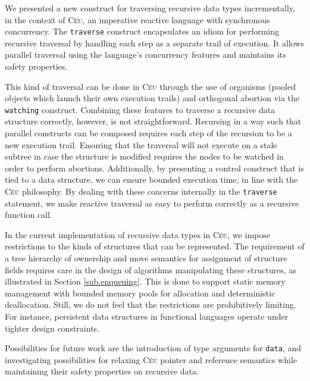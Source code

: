 \documentclass{sig-alternate}
\newcommand{\CEU}{\textsc{C\'{e}u}\xspace}
\newcommand{\code}[1] {{\small{\texttt{#1}}}}
\begin{document}
We presented a new construct for traversing recursive data types
incrementally, in the context of \CEU, an imperative reactive language with
synchronous concurrency. The \code{traverse} construct encapsulates an idiom
for performing recursive traversal by handling each step as a separate trail
of execution. It allows parallel traversal using the language's concurrency
features and maintains its safety properties.

This kind of traversal can be done in \CEU through the use of organisms
(pooled objects which launch their own execution trails) and orthogonal
abortion via the \code{watching} construct. Combining these features to
traverse a recursive data structure correctly, however, is not straightforward.
Recursing in a way such that parallel constructs can be composed requires each
step of the recursion to be a new execution trail. Ensuring that the traversal
will not execute on a stale subtree in case the structure is modified requires
the nodes to be watched in order to perform abortions. Additionally, by
presenting a control construct that is tied to a data structure, we can ensure
bounded execution time, in line with the \CEU philosophy. By dealing with these
concerns internally in the \code{traverse} statement, we make reactive
traversal as easy to perform correctly as a recursive function call.

In the current implementation of recursive data types in \CEU, we impose
restrictions to the kinds of structures that can be represented. The
requirement of a tree hierarchy of ownership and move semantics for assignment
of structure fields requires care in the design of algorithms
manipulating these structures, as illustrated in Section \ref{sub.enqueuing}.
This is done to support static memory management with bounded memory pools for
allocation and deterministic deallocation. Still, we do not feel that the
restrictions are prohibitively limiting. For instance, persistent data
structures in functional languages \cite{okasaki.purely} operate under tighter design constraints.

Possibilities for future work are the introduction of type arguments for \code{data},
and investigating possibilities for relaxing \CEU pointer and
reference semantics while maintaining their safety properties on recursive data.



\balancecolumns
\end{document}
